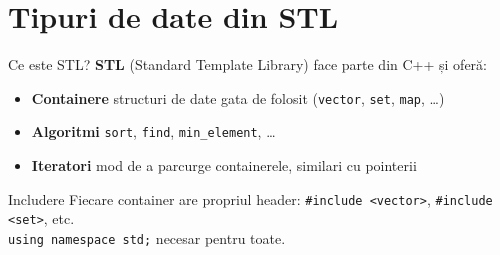﻿\documentclass{beamer}
\begin{document}
\section{Tipuri de date din STL}

\begin{frame}{Ce este STL?}
  \textbf{STL} (Standard Template Library) face parte din C++ și oferă:

  \begin{itemize}\itemsep6pt
    \item \textbf{Containere} \textemdash{} structuri de date gata de folosit
          (\texttt{vector}, \texttt{set}, \texttt{map}, \ldots)
    \item \textbf{Algoritmi} \textemdash{} \texttt{sort}, \texttt{find},
          \texttt{min\_element}, \ldots
    \item \textbf{Iteratori} \textemdash{} mod de a parcurge containerele, similari cu pointerii
  \end{itemize}

  \smallskip
  \begin{block}{Includere}
    Fiecare container are propriul header: \texttt{\#include <vector>},
    \texttt{\#include <set>}, etc. \\[4pt]
    \texttt{using namespace std;} \textemdash{} necesar pentru toate.
  \end{block}

\end{frame}
\end{document}

